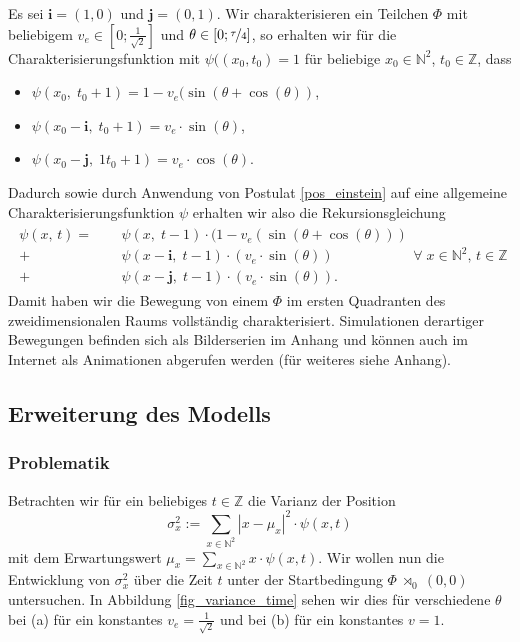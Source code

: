 \documentclass[a4paper,12pt,ngerman]{scrartcl}
\theoremstyle{plain}
\theoremstyle{plain}
\theoremstyle{plain}
\theoremstyle{plain}
\newcommand{\Z}{\mathbb{Z}}
\newcommand{\N}{\mathbb{N}}
\newcommand{\at}[1]{\;\rtimes_{#1}\;}
\begin{document}
Es sei $\pmb{i}=(1,0)$ und $\pmb{j}=(0,1)$. Wir charakterisieren ein Teilchen $\Phi$ mit beliebigem $v_e\in[0;\frac{1}{\sqrt{2}}]$ und $\theta\in[0;\nicefrac{\tau}{4}]$, so erhalten wir für die Charakterisierungsfunktion mit $\psi((x_0,t_0)=1$ für beliebige $x_0\in\N^2$, $t_0\in\Z$, dass 
\begin{itemize}
\item $\psi(x_0,\;t_0+1)=1-v_e(\sin(\theta+\cos(\theta))$,
\item $\psi(x_0-\pmb{i},\;t_0+1)=v_e\cdot\sin(\theta)$,
\item $\psi(x_0-\pmb{j},\;1t_0+1)=v_e\cdot\cos(\theta)$.
\end{itemize}
Dadurch sowie durch Anwendung von Postulat \ref{pos_einstein} auf eine allgemeine Charakterisierungsfunktion $\psi$ erhalten wir also die Rekursionsgleichung
\begin{align*}
\begin{split}
\psi(x,\,t)=\phantom{+}&\psi(x,\;t-1)\cdot(1-v_e(\sin(\theta+\cos(\theta)))\\
+\,&\psi(x-\pmb{i},\;t-1)\cdot(v_e\cdot\sin(\theta))\\
+\,&\psi(x-\pmb{j},\;t-1)\cdot(v_e\cdot\sin(\theta)).
\end{split} \forall\;x\in\N^2,\,t\in\Z
\end{align*}
Damit haben wir die Bewegung von einem $\Phi$ im ersten Quadranten des zweidimensionalen Raums vollständig charakterisiert. Simulationen derartiger Bewegungen befinden sich als Bilderserien im Anhang und können auch im Internet als Animationen abgerufen werden (für weiteres siehe Anhang).

\subsection{Erweiterung des Modells}

\subsubsection{Problematik}

Betrachten wir für ein beliebiges $t\in\Z$ die Varianz der Position
\[\sigma_x^2:=\sum_{x\in\N^2}|x-\mu_x|^2\cdot\psi(x,t)\]
mit dem Erwartungswert $\mu_x=\sum_{x\in\N^2}x\cdot\psi(x,t)$. Wir wollen nun die Entwicklung von $\sigma_x^2$ über die Zeit $t$ unter der Startbedingung $\Phi\at{0}(0,0)$ untersuchen. In Abbildung \ref{fig_variance_time} sehen wir dies für verschiedene $\theta$ bei (a) für ein konstantes $v_e=\frac{1}{\sqrt{2}}$ und bei (b) für ein konstantes $v=1$.
\end{document}
